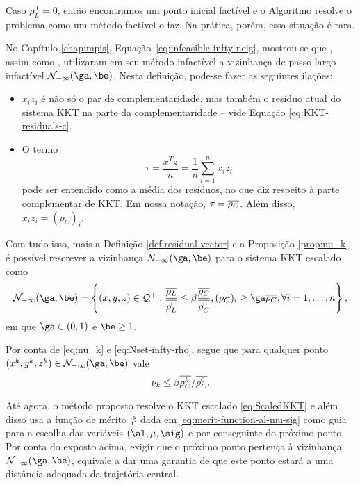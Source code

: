 Caso $\rho_L^0 = 0$, então encontramos um ponto inicial factível e o Algoritmo resolve o problema como um método factível o faz. Na prática, porém, essa situação é rara.


No Capítulo \ref{chap:mpis}, Equação~\eqref{eq:infeasible-infty-neig},
mostrou-se que \textcite{Kojima:1993fe}, assim como 
\textcite[pg.~110]{Wright:Primal-dual-interior-point:1997h}, utilizaram em seu
método infactível a vizinhança de passo largo infactível $\Nset_{-\infty}(\ga,\be)$. Nesta definição, pode-se fazer as seguintes ilações:
\begin{itemize}
  \item $x_iz_i$  é não só o par de complementaridade, mas também o resíduo
  atual do sistema KKT na parte da complementaridade -- vide  Equação
  \eqref{eq:KKT-residuals-c}.
  \item O termo  \[\tau = \frac{x^Tz}{n} = \frac{1}{n}\sum_{i=1}^nx_iz_i\]
  pode ser entendido como a média dos resíduos, no que diz respeito à parte
  complementar de KKT. Em nossa notação, $\tau = \overline{\rho_{C}}$. Além disso, $x_iz_i = (\rho_{C})_i$.
\end{itemize}

Com tudo isso, mais a Definição \ref{def:residual-vector} e a Proposição \ref{prop:nu_k}, é possível rescrever  a vizinhança
 $\Nset_{-\infty}(\ga,\be)$ para  o sistema KKT escalado
como
\begin{equation}\label{eq:Nset-infty-rho}
\Nset_{-\infty}(\ga,\be) =
 \left\{(x,y,z) \in \Qset^+:\frac{\dbvec{\rho_L}}{\dbvec{\rho^0_L}}    \leq
\beta\frac{\dbvec{\rho_C}}{\dbvec{\rho_C^{0}}}, (\rho_{C})_i \geq
{\ga}\dbvec{\rho_{C}},\forall i =1,\ldots,n  \right\},
\end{equation}
em que $\ga\in(0,1)$ e $\be\geq1$. 

Por conta de \eqref{eq:nu_k} e \eqref{eq:Nset-infty-rho}, segue que para qualquer ponto $(\xk,\yk,\zk)\in \Nset_{-\infty}(\ga,\be) $ vale
\begin{equation}
	\label{eq:nu_k-rho0-rhok}
	 \nu_{k} \leq \beta\overline{\rho_C^{k}}/\overline{\rho_C^{0}}.
\end{equation}


Até agora, o método proposto resolve o \ac{KKT} escalado \eqref{eq:ScaledKKT}
e além disso usa a função de mérito $\hat{\varphi}$ dada em
\eqref{eq:merit-function-al-mu-sig} como guia para a escolha das variáveis
$(\al,\mu,\sig)$  e por conseguinte do próximo ponto. Por conta do exposto
acima, exigir que o próximo ponto pertença à vizinhança $\Nset_{-\infty}(\ga,\be)$, equivale a dar 
uma garantia de que este ponto estará a uma  distância adequada da
trajetória central.

